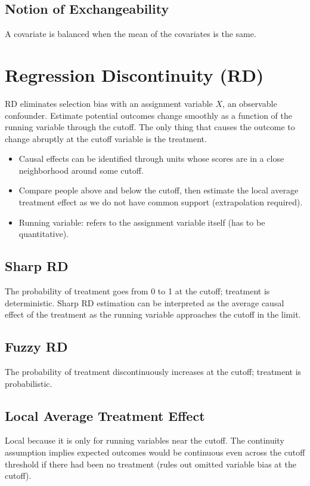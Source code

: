 \documentclass{article}
\begin{document}
\subsection*{Notion of Exchangeability}
A covariate is balanced when the mean of the covariates is the same.

\section*{Regression Discontinuity (RD)}
RD eliminates selection bias with an assignment variable \(X\), an observable confounder. Estimate potential outcomes change smoothly as a function of the running variable through the cutoff. The only thing that causes the outcome to change abruptly at the cutoff variable is the treatment.

\begin{itemize}
    \item Causal effects can be identified through units whose scores are in a close neighborhood around some cutoff.
    \item Compare people above and below the cutoff, then estimate the local average treatment effect as we do not have common support (extrapolation required).
    \item Running variable: refers to the assignment variable itself (has to be quantitative).
\end{itemize}

\subsection*{Sharp RD}
The probability of treatment goes from 0 to 1 at the cutoff; treatment is deterministic. Sharp RD estimation can be interpreted as the average causal effect of the treatment as the running variable approaches the cutoff in the limit.

\subsection*{Fuzzy RD}
The probability of treatment discontinuously increases at the cutoff; treatment is probabilistic.

\subsection*{Local Average Treatment Effect}
Local because it is only for running variables near the cutoff. The continuity assumption implies expected outcomes would be continuous even across the cutoff threshold if there had been no treatment (rules out omitted variable bias at the cutoff).
\end{document}
